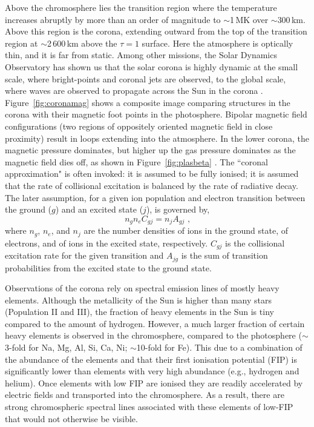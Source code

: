 Above the chromosphere lies the transition region where the temperature increases abruptly by more than an order of magnitude to $\sim$1\,MK over $\sim$300\,km. Above this region is the corona,  extending outward from the top of the transition region at $\sim$2\,600\,km above the $\tau=1$ surface. Here the atmosphere is optically thin, and it is far from static. Among other missions, the Solar Dynamics Observatory \citep[SDO;][]{Pesnell:2012} has shown us that the solar corona is highly dynamic at the small scale, where bright-points \citep{Vaiana:1973,PerezSuarez:2008} and coronal jets \citep{Innes:1997} are observed, to the global scale, where waves are observed to propagate across the Sun in the corona \citep{Long:2008}. Figure~\ref{fig:coronamag} shows a composite image comparing structures in the corona with their magnetic foot points in the photosphere. Bipolar magnetic field configurations (two regions of oppositely oriented magnetic field in close proximity) result in loops extending into the atmosphere. In the lower corona, the magnetic pressure dominates, but higher up the gas pressure dominates as the magnetic field dies off, as shown in Figure~\ref{fig:plasbeta} \citep{Gary:2001}. The ``coronal approximation" is often invoked: it is assumed to be fully ionised; it is assumed that the rate of collisional excitation is balanced by the rate of radiative decay. The later assumption, for a given ion population and electron transition between the ground ($g$) and an excited state ($j$), is governed by,
\begin{equation} 
n_g n_e C_{gj} = n_j A_{gj} \mbox{ ,}
\end{equation}
where $n_g$, $n_e$, and $n_j$ are the number densities of ions in the ground state, of electrons, and of ions in the excited state, respectively. $C_{gj}$ is the collisional excitation rate for the given transition and $A_{jg}$ is the sum of transition probabilities from the excited state to the ground state.

Observations of the corona rely on spectral emission lines of mostly heavy elements. Although the metallicity of the Sun is higher than many stars (Population II and III), the fraction of heavy elements in the Sun is tiny compared to the amount of hydrogen. However, a much larger fraction of certain heavy elements is observed in the chromosphere, compared to the photosphere ($\sim$3-fold for Na, Mg, Al, Si, Ca, Ni; $\sim$10-fold for Fe). This due to a combination of the abundance of the elements and that their first ionisation potential (FIP) is significantly lower than elements with very high abundance (e.g., hydrogen and helium). Once elements with low FIP are ionised they are readily accelerated by electric fields and transported into the chromosphere. As a result, there are strong chromospheric spectral lines associated with these elements of low-FIP that would not otherwise be visible.

